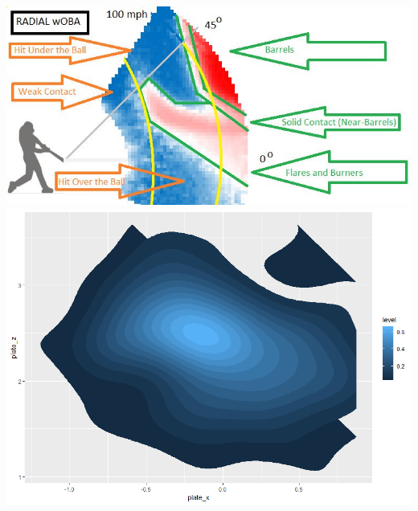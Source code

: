 \documentclass{article}
\begin{document}
\pagebreak
\includegraphics[width=\textwidth]{barrels.jpg}
\\
\includegraphics[width=\textwidth]{Rplot.png}

\pagebreak



\end{document}
